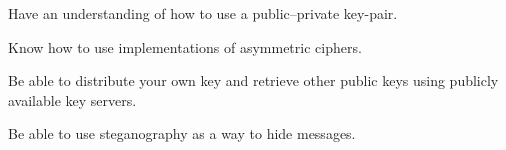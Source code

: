 \item Have an understanding of how to use a public--private key-pair.
\item Know how to use implementations of asymmetric ciphers.
\item Be able to distribute your own key and retrieve other public keys using 
publicly available key servers.
\item Be able to use steganography as a way to hide messages.
